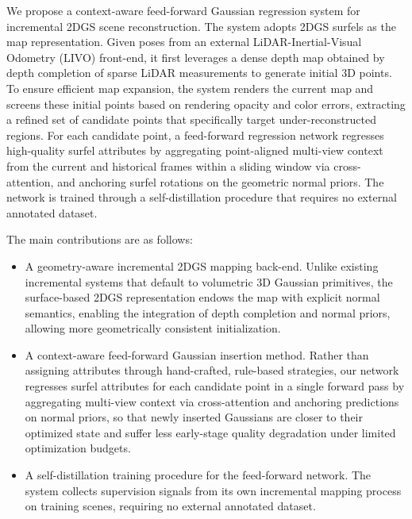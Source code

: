 \documentclass[letterpaper,journal]{IEEEtran}
\begin{document}
We propose a context-aware feed-forward Gaussian regression system for incremental 2DGS scene reconstruction. The system adopts 2DGS surfels as the map representation. Given poses from an external LiDAR-Inertial-Visual Odometry (LIVO) front-end, it first leverages a dense depth map obtained by depth completion of sparse LiDAR measurements to generate initial 3D points. To ensure efficient map expansion, the system renders the current map and screens these initial points based on rendering opacity and color errors, extracting a refined set of candidate points that specifically target under-reconstructed regions. For each candidate point, a feed-forward regression network regresses high-quality surfel attributes by aggregating point-aligned multi-view context from the current and historical frames within a sliding window via cross-attention, and anchoring surfel rotations on the geometric normal priors. The network is trained through a self-distillation procedure that requires no external annotated dataset.

The main contributions are as follows:

\begin{itemize}
    \item A geometry-aware incremental 2DGS mapping back-end. Unlike existing incremental systems that default to volumetric 3D Gaussian primitives, the surface-based 2DGS representation endows the map with explicit normal semantics, enabling the integration of depth completion and normal priors, allowing more geometrically consistent initialization.

    \item A context-aware feed-forward Gaussian insertion method. Rather than assigning attributes through hand-crafted, rule-based strategies, our network regresses surfel attributes for each candidate point in a single forward pass by aggregating multi-view context via cross-attention and anchoring predictions on normal priors, so that newly inserted Gaussians are closer to their optimized state and suffer less early-stage quality degradation under limited optimization budgets.

    \item A self-distillation training procedure for the feed-forward network. The system collects supervision signals from its own incremental mapping process on training scenes, requiring no external annotated dataset.
\end{itemize}

\end{document}

